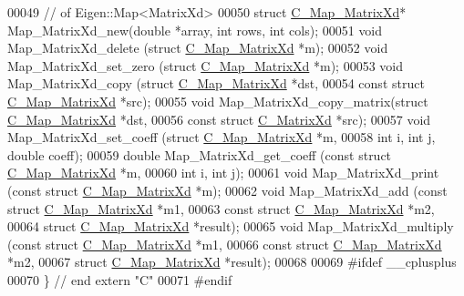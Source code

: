 \begin{DoxyCode}
00049   \textcolor{comment}{// of Eigen::Map<MatrixXd>}
00050   \textcolor{keyword}{struct }\hyperlink{struct_c___map___matrix_xd}{C\_Map\_MatrixXd}* Map\_MatrixXd\_new(\textcolor{keywordtype}{double} *array, \textcolor{keywordtype}{int} rows, \textcolor{keywordtype}{int} cols);
00051   \textcolor{keywordtype}{void}   Map\_MatrixXd\_delete     (\textcolor{keyword}{struct} \hyperlink{struct_c___map___matrix_xd}{C\_Map\_MatrixXd} *m);
00052   \textcolor{keywordtype}{void}   Map\_MatrixXd\_set\_zero   (\textcolor{keyword}{struct} \hyperlink{struct_c___map___matrix_xd}{C\_Map\_MatrixXd} *m);
00053   \textcolor{keywordtype}{void}   Map\_MatrixXd\_copy       (\textcolor{keyword}{struct} \hyperlink{struct_c___map___matrix_xd}{C\_Map\_MatrixXd} *dst,
00054                                   \textcolor{keyword}{const} \textcolor{keyword}{struct} \hyperlink{struct_c___map___matrix_xd}{C\_Map\_MatrixXd} *src);
00055   \textcolor{keywordtype}{void}   Map\_MatrixXd\_copy\_matrix(\textcolor{keyword}{struct} \hyperlink{struct_c___map___matrix_xd}{C\_Map\_MatrixXd} *dst,
00056                                   \textcolor{keyword}{const} \textcolor{keyword}{struct} \hyperlink{struct_c___matrix_xd}{C\_MatrixXd} *src);  
00057   \textcolor{keywordtype}{void}   Map\_MatrixXd\_set\_coeff  (\textcolor{keyword}{struct} \hyperlink{struct_c___map___matrix_xd}{C\_Map\_MatrixXd} *m,
00058                                   \textcolor{keywordtype}{int} i, \textcolor{keywordtype}{int} j, \textcolor{keywordtype}{double} coeff);
00059   \textcolor{keywordtype}{double} Map\_MatrixXd\_get\_coeff  (\textcolor{keyword}{const} \textcolor{keyword}{struct} \hyperlink{struct_c___map___matrix_xd}{C\_Map\_MatrixXd} *m,
00060                                   \textcolor{keywordtype}{int} i, \textcolor{keywordtype}{int} j);
00061   \textcolor{keywordtype}{void}   Map\_MatrixXd\_print      (\textcolor{keyword}{const} \textcolor{keyword}{struct} \hyperlink{struct_c___map___matrix_xd}{C\_Map\_MatrixXd} *m);
00062   \textcolor{keywordtype}{void}   Map\_MatrixXd\_add        (\textcolor{keyword}{const} \textcolor{keyword}{struct} \hyperlink{struct_c___map___matrix_xd}{C\_Map\_MatrixXd} *m1,
00063                                   \textcolor{keyword}{const} \textcolor{keyword}{struct} \hyperlink{struct_c___map___matrix_xd}{C\_Map\_MatrixXd} *m2,
00064                                   \textcolor{keyword}{struct} \hyperlink{struct_c___map___matrix_xd}{C\_Map\_MatrixXd} *result);  
00065   \textcolor{keywordtype}{void}   Map\_MatrixXd\_multiply   (\textcolor{keyword}{const} \textcolor{keyword}{struct} \hyperlink{struct_c___map___matrix_xd}{C\_Map\_MatrixXd} *m1,
00066                                   \textcolor{keyword}{const} \textcolor{keyword}{struct} \hyperlink{struct_c___map___matrix_xd}{C\_Map\_MatrixXd} *m2,
00067                                   \textcolor{keyword}{struct} \hyperlink{struct_c___map___matrix_xd}{C\_Map\_MatrixXd} *result);
00068 
00069 \textcolor{preprocessor}{#ifdef \_\_cplusplus}
00070 \} \textcolor{comment}{// end extern "C"}
00071 \textcolor{preprocessor}{#endif}
\end{DoxyCode}
